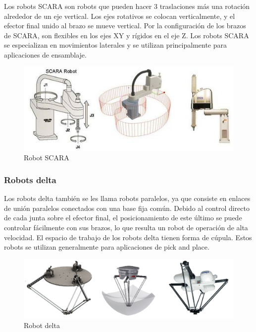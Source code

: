         Los robots SCARA son robots que pueden hacer 3 traslaciones más una rotación alrededor de un eje vertical. Los ejes rotativos se colocan verticalmente, y el efector final unido al brazo se mueve vertical. Por la configuración de los brazos de SCARA, son flexibles en los ejes XY y rígidos en el eje Z. Los robots SCARA se especializan en movimientos laterales y se utilizan principalmente para aplicaciones de ensamblaje. 
        
        \begin{figure}[htb]
            \centering
            \includegraphics[width=0.9\linewidth]{Main/Chapter2/Images2/Robot-SCARA.png}
            \caption{Robot SCARA  \cite{cap2_class_mov}}
            \label{f:Cap2_segunMovimiento_scara}
        \end{figure}
        
        \subsubsection{Robots delta}
        
        Los robots delta también se les llama robots paralelos, ya que consiste en enlaces de unión paralelos conectados con una base fija común. Debido al control directo de cada junta sobre el efector final, el posicionamiento de este último se puede controlar fácilmente con sus brazos, lo que resulta un robot de operación de alta velocidad. El espacio de trabajo de los robots delta tienen forma de cúpula. Estos robots se utilizan generalmente para aplicaciones de pick and place.
        
        \begin{figure}[htb]
            \centering
            \includegraphics[width=0.9\linewidth]{Main/Chapter2/Images2/Robot-delta.png}
            \caption{Robot delta \cite{cap2_rdelta_1}\cite{cap2_rdelta_2}\cite{cap2_rdelta_3}}
            \label{f:Cap2_segunMovimiento_delta}
        \end{figure}
        
